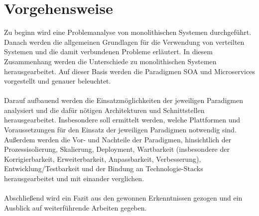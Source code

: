 \section{Vorgehensweise}
\label{sec:Vorgehensweise}
Zu beginn wird eine Problemanalyse von monolithischen Systemen durchgeführt. Danach werden die allgemeinen Grundlagen für die Verwendung von verteilten Systemen und die damit verbundenen Probleme erläutert. In diesem Zusammenhang werden die Unterschiede zu monolithischen Systemen herausgearbeitet. Auf dieser Basis werden die Paradigmen SOA und Microservices vorgestellt und genauer beleuchtet.
\\\\
Darauf aufbauend werden die Einsatzmöglichkeiten der jeweiligen Paradigmen analysiert und die dafür nötigen Architekturen und Schnittstellen herausgearbeitet. Insbesondere soll ermittelt werden, welche Plattformen und Voraussetzungen für den Einsatz der jeweiligen Paradigmen notwendig sind. Außerdem werden die Vor- und Nachteile der Paradigmen, hinsichtlich der Prozessisolierung, Skalierung, Deployment, Wartbarkeit (insbesondere der Korrigierbarkeit, Erweiterbarkeit, Anpassbarkeit, Verbesserung), Entwicklung/Testbarkeit und der Bindung an Technologie-Stacks herausgearbeitet und mit einander verglichen.
\\\\
Abschließend wird ein Fazit aus den gewonnen Erkenntnissen gezogen und ein Ausblick auf weiterführende Arbeiten gegeben.